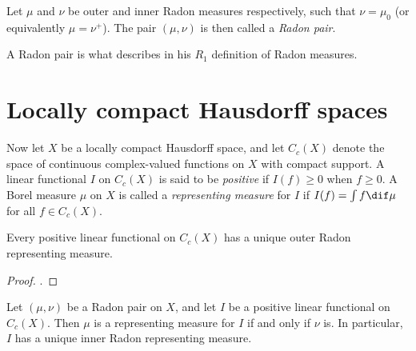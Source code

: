 \documentclass[article, a4paper, 11pt, oneside]{memoir}
\numberwithin{equation}{chapter}
\newcommand{\calB}{\mathcal{B}}
\newcommand{\borel}[1]{\calB(#1)}
\begin{document}




\begin{definition}
    \label{def:Radon-pairs}
    Let $\mu$ and $\nu$ be outer and inner Radon measures respectively, such that $\nu = \mu_0$ (or equivalently $\mu = \nu^+$). The pair $(\mu,\nu)$ is then called a \emph{Radon pair}\footnotemark{}.
\end{definition}
%
A Radon pair is what \textcite{schwartz1973} describes in his $R_1$ definition of Radon measures.


\section{Locally compact Hausdorff spaces}






Now let $X$ be a locally compact Hausdorff space, and let $C_c(X)$ denote the space of continuous complex-valued functions on $X$ with compact support. A linear functional $I$ on $C_c(X)$ is said to be \emph{positive} if $I(f) \geq 0$ when $f \geq 0$. A Borel measure $\mu$ on $X$ is called a \emph{representing measure} for $I$ if $I(f) = \int f \dif\mu$ for all $f \in C_c(X)$.

\begin{theorem}
    Every positive linear functional on $C_c(X)$ has a unique outer Radon representing measure.
\end{theorem}

\begin{proof}
    \textcite[Theorem~7.2]{folland2007}.
\end{proof}

\begin{proposition}
    Let $(\mu,\nu)$ be a Radon pair on $X$, and let $I$ be a positive linear functional on $C_c(X)$. Then $\mu$ is a representing measure for $I$ if and only if $\nu$ is. In particular, $I$ has a unique inner Radon representing measure.
\end{proposition}
\end{document}

